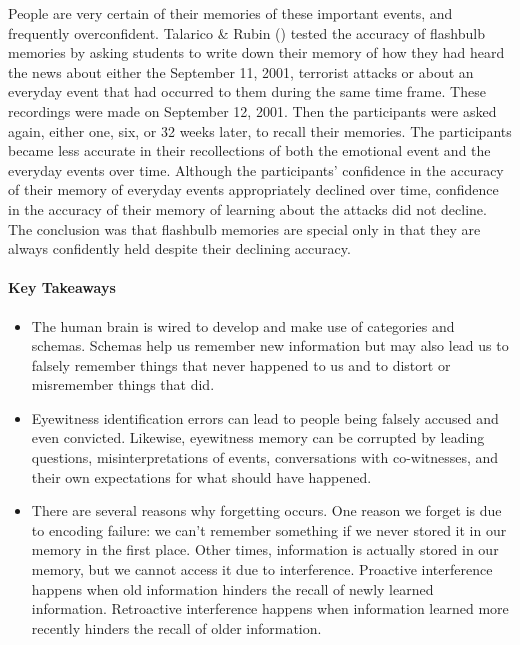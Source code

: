 \documentclass[
]{krantz}
\providecommand{\tightlist}{%
  \setlength{\itemsep}{0pt}\setlength{\parskip}{0pt}}
\begin{document}
People are very certain of their memories of these important events, and frequently overconfident. Talarico \& Rubin () tested the accuracy of flashbulb memories by asking students to write down their memory of how they had heard the news about either the September 11, 2001, terrorist attacks or about an everyday event that had occurred to them during the same time frame. These recordings were made on September 12, 2001. Then the participants were asked again, either one, six, or 32 weeks later, to recall their memories. The participants became less accurate in their recollections of both the emotional event and the everyday events over time. Although the participants' confidence in the accuracy of their memory of everyday events appropriately declined over time, confidence in the accuracy of their memory of learning about the attacks did not decline. The conclusion was that flashbulb memories are special only in that they are always confidently held despite their declining accuracy.

\paragraph*{Key Takeaways}\label{key-takeaways-5}

\begin{itemize}
\tightlist
\item
  The human brain is wired to develop and make use of categories and schemas. Schemas help us remember new information but may also lead us to falsely remember things that never happened to us and to distort or misremember things that did.
\item
  Eyewitness identification errors can lead to people being falsely accused and even convicted. Likewise, eyewitness memory can be corrupted by leading questions, misinterpretations of events, conversations with co-witnesses, and their own expectations for what should have happened.
\item
  There are several reasons why forgetting occurs. One reason we forget is due to encoding failure: we can't remember something if we never stored it in our memory in the first place. Other times, information is actually stored in our memory, but we cannot access it due to interference. Proactive interference happens when old information hinders the recall of newly learned information. Retroactive interference happens when information learned more recently hinders the recall of older information.
\end{itemize}
\end{document}
